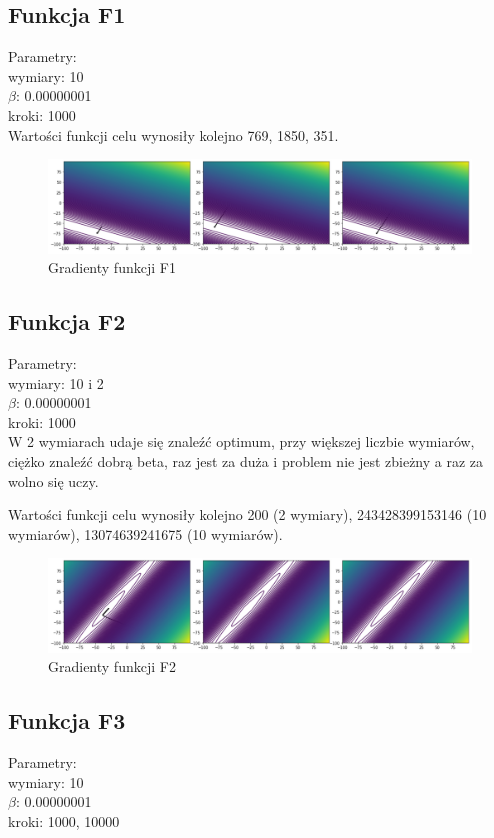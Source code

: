 \documentclass{article}
\begin{document}
\subsection*{Funkcja F1}
Parametry:\\
wymiary: 10\\
$\beta$: 0.00000001\\
kroki: 1000\\

\noindent Wartości funkcji celu wynosiły kolejno 769, 1850, 351.

\begin{figure}[!h]
    \centering \includegraphics[width=\linewidth]{f1.pdf}
    \caption{Gradienty funkcji F1}
\end{figure}

\subsection*{Funkcja F2}
Parametry:\\
wymiary: 10 i 2\\
$\beta$: 0.00000001\\
kroki: 1000\\

\noindent W 2 wymiarach udaje się znaleźć optimum, przy większej liczbie wymiarów, ciężko znaleźć dobrą beta, raz jest za duża i problem nie jest zbieżny a raz za wolno się uczy.

\noindent Wartości funkcji celu wynosiły kolejno 200 (2 wymiary), 243428399153146 (10 wymiarów), 13074639241675 (10 wymiarów).
\begin{figure}[!h]
    \centering \includegraphics[width=\linewidth]{f2.pdf}
    \caption{Gradienty funkcji F2}
\end{figure}


\subsection*{Funkcja F3}
Parametry:\\
wymiary: 10\\
$\beta$: 0.00000001\\
kroki: 1000, 10000\\
\end{document}
